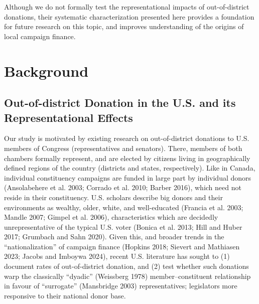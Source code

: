 \documentclass[
  letterpaper,
  DIV=11,
  numbers=noendperiod]{scrartcl}
\begin{document}
Although we do not formally test the representational impacts of
out-of-district donations, their systematic characterization presented
here provides a foundation for future research on this topic, and
improves understanding of the origins of local campaign finance.

\section{Background}\label{sec-lit}

\subsection{Out-of-district Donation in the U.S. and its
Representational Effects}\label{sec-lit-motivation}

Our study is motivated by existing research on out-of-district donations
to U.S. members of Congress (representatives and senators). There,
members of both chambers formally represent, and are elected by citizens
living in geographically defined regions of the country (districts and
states, respectively). Like in Canada, individual constituency campaigns
are funded in large part by individual donors (Ansolabehere et al. 2003;
Corrado et al. 2010; Barber 2016), which need not reside in their
constituency. U.S. scholars describe big donors and their environments
as wealthy, older, white, and well-educated (Francia et al. 2003; Mandle
2007; Gimpel et al. 2006), characteristics which are decidedly
unrepresentative of the typical U.S. voter (Bonica et al. 2013; Hill and
Huber 2017; Grumbach and Sahn 2020). Given this, and broader trends in
the ``nationalization'' of campaign finance (Hopkins 2018; Sievert and
Mathiasen 2023; Jacobs and Imboywa 2024), recent U.S. literature has
sought to (1) document rates of out-of-district donation, and (2) test
whether such donations warp the classically ``dyadic'' (Weissberg 1978)
member--constituent relationship in favour of ``surrogate'' (Mansbridge
2003) representatives; legislators more responsive to their national
donor base.
\end{document}
